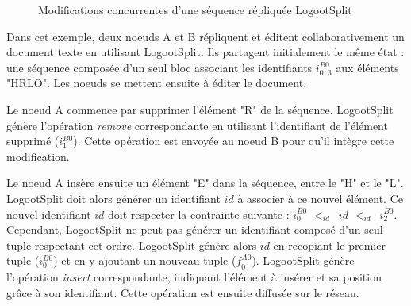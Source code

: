 \documentclass[12pt]{thesul}
\newcommand{\trm}[1]{\mathit{#1}}
\newcommand{\id}[3]{$\trm{#1}^{\trm{#2}}_{\trm{#3}}$}
\newcommand{\lid}{$<_{id}$~}
\begin{document}
\begin{figure}[!ht]
{
  }
  \caption{Modifications concurrentes d'une séquence répliquée LogootSplit}
  \label{fig:logootsplit-example}
\end{figure}

Dans cet exemple, deux noeuds A et B répliquent et éditent collaborativement un document texte en utilisant LogootSplit.
Ils partagent initialement le même état : une séquence composée d'un seul bloc associant les identifiants \id{i}{B0}{0..3} aux éléments "HRLO".
Les noeuds se mettent ensuite à éditer le document.

Le noeud A commence par supprimer l'élément "R" de la séquence.
LogootSplit génère l'opération \emph{remove} correspondante en utilisant l'identifiant de l'élément supprimé (\id{i}{B0}{1}).
Cette opération est envoyée au noeud B pour qu'il intègre cette modification.

Le noeud A insère ensuite un élément "E" dans la séquence, entre le "H" et le "L".
LogootSplit doit alors générer un identifiant $id$ à associer à ce nouvel élément.
Ce nouvel identifiant $id$ doit respecter la contrainte suivante : \id{i}{B0}{0} \lid $id$ \lid \id{i}{B0}{2}.
Cependant, LogootSplit ne peut pas générer un identifiant composé d'un seul tuple respectant cet ordre.
LogootSplit génère alors $id$ en recopiant le premier tuple (\id{i}{B0}{0}) et en y ajoutant un nouveau tuple (\id{f}{A0}{0}).
LogootSplit génère l'opération \emph{insert} correspondante, indiquant l'élément à insérer et sa position grâce à son identifiant.
Cette opération est ensuite diffusée sur le réseau.
\end{document}
